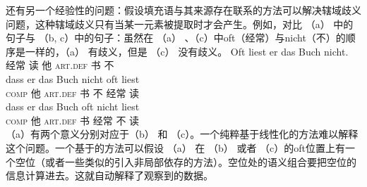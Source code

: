 还有另一个经验性的问题：假设填充语与其来源存在联系的方法可以解决辖域歧义问题，这种辖域歧义只有当某一元素被提取时才会产生。例如，对比 （a） 中的句子与 （b, c）中的句子：虽然在 （a） 、（c）中oft（经常）与nicht（不）的顺序是一样的，（a） 有歧义，但是 （c） 没有歧义。
\eal
\ex 
\gll Oft liest er das Buch nicht.\\
     经常 读 他 \textsc{art}.\textsc{def} 书 不\\
\ex
\gll dass er das Buch nicht oft liest\\
     \textsc{comp} 他 \textsc{art}.\textsc{def} 书 不 经常 读\\
\ex
\gll dass er das Buch oft nicht liest\\
     \textsc{comp} 他 \textsc{art}.\textsc{def} 书 经常 不 读\\
\zl
（a）有两个意义分别对应于（b） 和 （c）。一个纯粹基于线性化的方法难以解释这个问题。一个基于\slaschc 的方法可以假设 （a） 在 （b） 或者 （c）的oft位置上有一个空位（或者一些类似的引入非局部依存的方法）。空位处的语义组合要把空位的信息计算进去。这就自动解释了观察到的数据。

